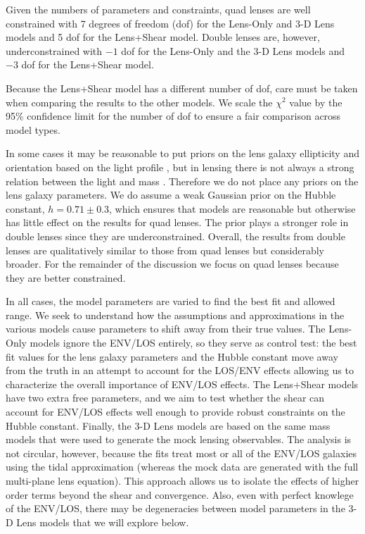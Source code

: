 \documentclass{emulateapj}
\begin{document}
Given the numbers of parameters and constraints, quad lenses are well constrained with 7 degrees of freedom (dof) for the Lens-Only and 3-D Lens models and 5 dof for the Lens+Shear model. Double lenses are, however, underconstrained with $-1$ dof for the Lens-Only and the 3-D Lens models and $-3$ dof for the Lens+Shear model.

Because the Lens+Shear model has a different number of dof, care must be taken when comparing the results to the other models. We scale the $\chi^2$ value by the 95\% confidence limit for the number of dof to ensure a fair comparison across model types.

In some cases it may be reasonable to put priors on the lens galaxy ellipticity and orientation based on the light profile \citep[e.g.,][]{Bolton08}, but in lensing there is not always a strong relation between the light and mass \citep[][and references therein]{Bruderer15}. Therefore we do not place any priors on the lens galaxy parameters.  We do assume a weak Gaussian prior on the Hubble constant, $h = 0.71 \pm 0.3$, which ensures that models are reasonable but otherwise has little effect on the results for quad lenses.  The prior plays a stronger role in double lenses since they are underconstrained.  Overall, the results from double lenses are qualitatively similar to those from quad lenses but considerably broader.  For the remainder of the discussion we focus on quad lenses because they are better constrained.


In all cases, the model parameters are varied to find the best fit and allowed range.  We seek to understand how the assumptions and approximations in the various models cause parameters to shift away from their true values. 
The Lens-Only models ignore the ENV/LOS entirely, so they serve as control test: the best fit values for the lens galaxy parameters and the Hubble constant move away from the truth in an attempt to account for the LOS/ENV effects allowing us to characterize the overall importance of ENV/LOS effects. The Lens+Shear models have two extra free parameters, and we aim to test whether the shear can account for ENV/LOS effects well enough to provide robust constraints on the Hubble constant. Finally, the 3-D Lens models are based on the same mass models that were used to generate the mock lensing observables. The analysis is not circular, however, because the fits treat most or all of the ENV/LOS galaxies using the tidal approximation (whereas the mock data are generated with the full multi-plane lens equation). This approach allows us to isolate the effects of higher order terms beyond the shear and convergence. Also, even with perfect knowlege of the ENV/LOS, there may be degeneracies between model parameters in the 3-D Lens models that we will explore below. 
\end{document}
